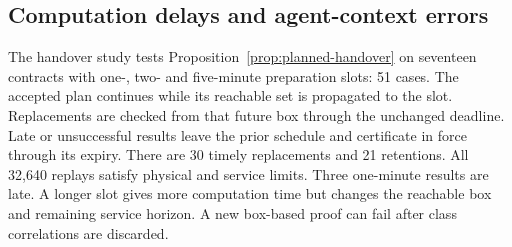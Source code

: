 \documentclass[preprint,12pt]{elsarticle}
\begin{document}
\subsection{Computation delays and agent-context errors}
\label{sec:delayed-handover-results}
\label{sec:task-state-live}
\label{sec:queue-live-pilot}
\label{sec:primary-memory-pressure}

The handover study tests Proposition~\ref{prop:planned-handover} on seventeen
contracts with one-, two- and five-minute preparation slots: 51 cases.
The accepted plan continues while its reachable set is propagated to the
slot. Replacements are checked from that future box through the unchanged
deadline. Late or unsuccessful results leave the prior schedule and
certificate in force through its expiry. There are 30 timely replacements
and 21 retentions. All 32,640 replays satisfy physical and service limits.
Three one-minute results are late. A longer slot gives more computation
time but changes the reachable box and remaining service horizon. A new
box-based proof can fail after class correlations are discarded.
\end{document}
